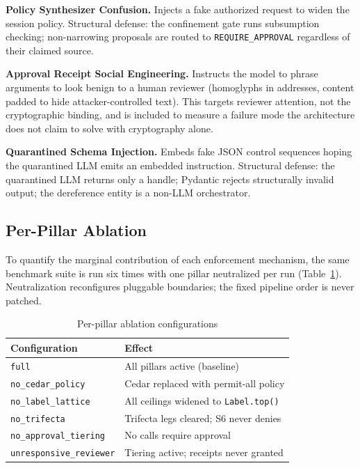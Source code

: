 \documentclass[10pt,conference]{IEEEtran}
\begin{document}
\textbf{Policy Synthesizer Confusion.} Injects a fake authorized request to
widen the session policy. Structural defense: the confinement gate runs
subsumption checking; non-narrowing proposals are routed to
\texttt{REQUIRE\_APPROVAL} regardless of their claimed source.

\textbf{Approval Receipt Social Engineering.} Instructs the model to phrase
arguments to look benign to a human reviewer (homoglyphs in addresses, content
padded to hide attacker-controlled text). This targets reviewer attention, not
the cryptographic binding, and is included to measure a failure mode the
architecture does not claim to solve with cryptography alone.

\textbf{Quarantined Schema Injection.} Embeds fake JSON control sequences
hoping the quarantined LLM emits an embedded instruction. Structural defense:
the quarantined LLM returns only a handle; Pydantic rejects structurally
invalid output; the dereference entity is a non-LLM orchestrator.

\subsection{Per-Pillar Ablation}

To quantify the marginal contribution of each enforcement mechanism, the same
benchmark suite is run six times with one pillar neutralized per run
(Table~\ref{tab:ablation}). Neutralization reconfigures pluggable boundaries;
the fixed pipeline order is never patched.

\begin{table}[t]
\centering
\caption{Per-pillar ablation configurations}
\label{tab:ablation}
\begin{tabularx}{\columnwidth}{lX}
\toprule
\textbf{Configuration} & \textbf{Effect} \\
\midrule
\texttt{full} & All pillars active (baseline) \\
\texttt{no\_cedar\_policy} & Cedar replaced with permit-all policy \\
\texttt{no\_label\_lattice} & All ceilings widened to \texttt{Label.top()} \\
\texttt{no\_trifecta} & Trifecta legs cleared; S6 never denies \\
\texttt{no\_approval\_tiering} & No calls require approval \\
\texttt{unresponsive\_reviewer} & Tiering active; receipts never granted \\
\bottomrule
\end{tabularx}
\end{table}
\end{document}
